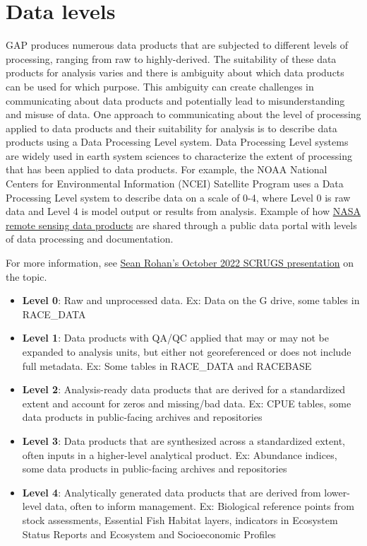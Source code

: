 \documentclass[
  letterpaper,
  oneside,
  open=any]{scrbook}
\providecommand{\tightlist}{%
  \setlength{\itemsep}{0pt}\setlength{\parskip}{0pt}}\usepackage{longtable,booktabs,array}
\begin{document}
\hypertarget{data-levels}{%
\section{Data levels}\label{data-levels}}

GAP produces numerous data products that are subjected to different
levels of processing, ranging from raw to highly-derived. The
suitability of these data products for analysis varies and there is
ambiguity about which data products can be used for which purpose. This
ambiguity can create challenges in communicating about data products and
potentially lead to misunderstanding and misuse of data. One approach to
communicating about the level of processing applied to data products and
their suitability for analysis is to describe data products using a Data
Processing Level system. Data Processing Level systems are widely used
in earth system sciences to characterize the extent of processing that
has been applied to data products. For example, the NOAA National
Centers for Environmental Information (NCEI) Satellite Program uses a
Data Processing Level system to describe data on a scale of 0-4, where
Level 0 is raw data and Level 4 is model output or results from
analysis. Example of how
\href{https://ladsweb.modaps.eosdis.nasa.gov/search/}{NASA remote
sensing data products} are shared through a public data portal with
levels of data processing and documentation.

For more information, see
\href{https://docs.google.com/presentation/d/1rWSZpeghWJqzWMIa5oBc4BCoy-zy1Yue86RoTw58u6M/edit?usp=sharing}{Sean
Rohan's October 2022 SCRUGS presentation} on the topic.

\begin{itemize}
\tightlist
\item
  \textbf{Level 0}: Raw and unprocessed data. Ex: Data on the G drive,
  some tables in RACE\_DATA
\item
  \textbf{Level 1}: Data products with QA/QC applied that may or may not
  be expanded to analysis units, but either not georeferenced or does
  not include full metadata. Ex: Some tables in RACE\_DATA and RACEBASE
\item
  \textbf{Level 2}: Analysis-ready data products that are derived for a
  standardized extent and account for zeros and missing/bad data. Ex:
  CPUE tables, some data products in public-facing archives and
  repositories
\item
  \textbf{Level 3}: Data products that are synthesized across a
  standardized extent, often inputs in a higher-level analytical
  product. Ex: Abundance indices, some data products in public-facing
  archives and repositories
\item
  \textbf{Level 4}: Analytically generated data products that are
  derived from lower-level data, often to inform management. Ex:
  Biological reference points from stock assessments, Essential Fish
  Habitat layers, indicators in Ecosystem Status Reports and Ecosystem
  and Socioeconomic Profiles
\end{itemize}
\end{document}
